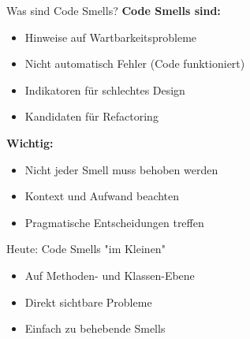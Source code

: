 \begin{frame}{Was sind Code Smells?}
  \textbf{Code Smells sind:}
  \begin{itemize}
    \item Hinweise auf Wartbarkeitsprobleme
    \item Nicht automatisch Fehler (Code funktioniert)
    \item Indikatoren für schlechtes Design
    \item Kandidaten für Refactoring
  \end{itemize}

  \textbf{Wichtig:}
  \begin{itemize}
    \item Nicht jeder Smell muss behoben werden
    \item Kontext und Aufwand beachten
    \item Pragmatische Entscheidungen treffen
  \end{itemize}

  \begin{exampleblock}{Heute: Code Smells "im Kleinen"}
    \begin{itemize}
      \item Auf Methoden- und Klassen-Ebene
      \item Direkt sichtbare Probleme
      \item Einfach zu behebende Smells
    \end{itemize}
  \end{exampleblock}
\end{frame}


